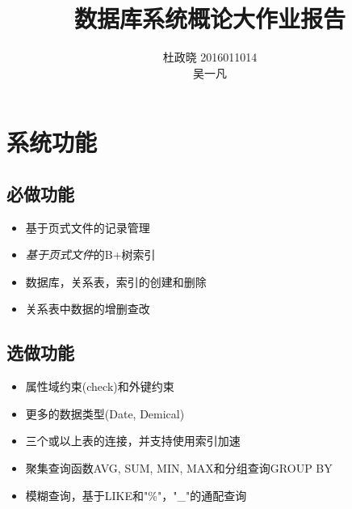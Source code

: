 \documentclass[11pt,UTF8]{report}
\title{数据库系统概论大作业报告}
\author{杜政晓 2016011014\\
吴一凡 }
\begin{document}
\maketitle

\section{系统功能}
\subsection{必做功能}
\begin{itemize}
	\item 基于页式文件的记录管理
	\item \emph{基于页式文件}的B+树索引
	\item 数据库，关系表，索引的创建和删除
	\item 关系表中数据的增删查改
\end{itemize}

\subsection{选做功能}
\begin{itemize}
	\item 属性域约束(check)和外键约束
	\item 更多的数据类型(Date, Demical)
	\item 三个或以上表的连接，并支持使用索引加速
	\item 聚集查询函数AVG, SUM, MIN, MAX和分组查询GROUP BY
	\item 模糊查询，基于LIKE和"\%"，"\_"的通配查询
\end{itemize}
\end{document}
